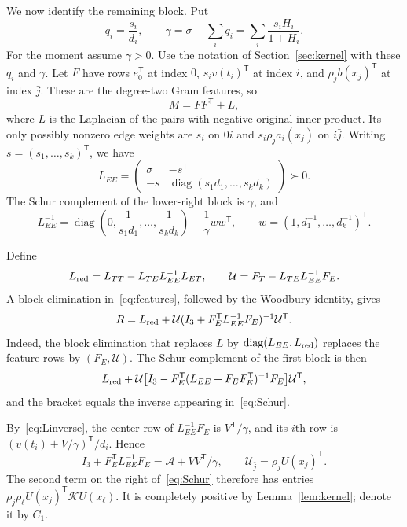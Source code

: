 \documentclass[11pt]{article}
\theoremstyle{remark}
\DeclareMathOperator{\diag}{diag}
\begin{document}
We now identify the remaining block. Put
\begin{equation}\label{eq:qgamma}
 q_i=\frac{s_i}{d_i},\qquad
 \gamma=\sigma-\sum_iq_i=\sum_i\frac{s_iH_i}{1+H_i}.
\end{equation}
For the moment assume $\gamma>0$.
Use the notation of Section~\ref{sec:kernel} with these $q_i$ and $\gamma$.
Let $F$ have rows $e_0^{\mathsf T}$ at index $0$,
$s_iv(t_i)^{\mathsf T}$ at index $i$, and
$\rho_jb(x_j)^{\mathsf T}$ at index $\bar j$.
These are the degree-two Gram features, so
\begin{equation}\label{eq:features}
 M=FF^{\mathsf T}+L,
\end{equation}
where $L$ is the Laplacian of the pairs with negative original inner product.
Its only possibly nonzero edge weights are $s_i$ on $0i$ and
$s_i\rho_j a_i(x_j)$ on $i\bar j$.
Writing $s=(s_1,\ldots,s_k)^{\mathsf T}$, we have
\[
 L_{EE}=\begin{pmatrix}
 \sigma&-s^{\mathsf T}\\
 -s&\diag(s_1d_1,\ldots,s_kd_k)
 \end{pmatrix}\succ0.
\]
The Schur complement of the lower-right block is $\gamma$, and
\begin{equation}\label{eq:Linverse}
 L_{EE}^{-1}=\diag\left(0,\frac1{s_1d_1},\ldots,\frac1{s_kd_k}\right)
             +\frac1\gamma ww^{\mathsf T},\qquad
 w=(1,d_1^{-1},\ldots,d_k^{-1})^{\mathsf T}.
\end{equation}

Define
\[
 L_{\rm red}=L_{TT}-L_{TE}L_{EE}^{-1}L_{ET},\qquad
 \mathcal U=F_T-L_{TE}L_{EE}^{-1}F_E.
\]
A block elimination in~\eqref{eq:features}, followed by the Woodbury identity,
gives
\begin{equation}\label{eq:Schur}
 R=L_{\rm red}+\mathcal U
       (I_3+F_E^{\mathsf T}L_{EE}^{-1}F_E)^{-1}\mathcal U^{\mathsf T}.
\end{equation}
Indeed, the block elimination that replaces $L$ by
$\diag(L_{EE},L_{\rm red})$ replaces the feature rows by $(F_E,\mathcal U)$.
The Schur complement of the first block is then
\[
 L_{\rm red}+\mathcal U
 \bigl[I_3-F_E^{\mathsf T}(L_{EE}+F_EF_E^{\mathsf T})^{-1}F_E\bigr]
 \mathcal U^{\mathsf T},
\]
and the bracket equals the inverse appearing in~\eqref{eq:Schur}.

By~\eqref{eq:Linverse}, the center row of $L_{EE}^{-1}F_E$ is
$V^{\mathsf T}/\gamma$, and its $i$th row is
$(v(t_i)+V/\gamma)^{\mathsf T}/d_i$. Hence
\[
 I_3+F_E^{\mathsf T}L_{EE}^{-1}F_E
 =\mathcal A+VV^{\mathsf T}/\gamma,\qquad
 \mathcal U_{\bar j}=\rho_jU(x_j)^{\mathsf T}.
\]
The second term on the right of~\eqref{eq:Schur} therefore has entries
$\rho_j\rho_\ell U(x_j)^{\mathsf T}\mathcal K U(x_\ell)$.
It is completely positive by Lemma~\ref{lem:kernel}; denote it by $C_1$.
\end{document}
